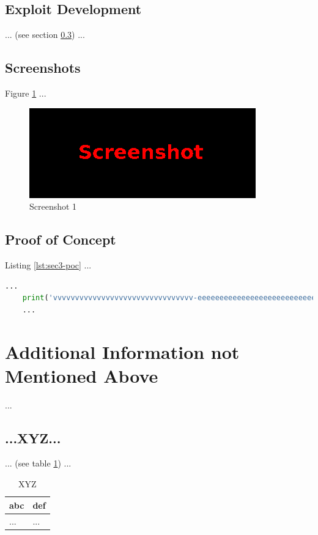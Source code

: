 \subsection{Exploit Development}\label{sec:sec3-expl}
%
... (see section \ref{sec:sec3-poc}) ...
%
%
%
\subsection{Screenshots}\label{sec:sec3-screen1}
%
Figure \ref{fig:sec3-screen1} ...

\begin{figure}[H]
    \centering
    \includegraphics[width=\textwidth]{img/assignment1/screen1.png}
    \caption{Screenshot 1}\label{fig:sec3-screen1}
\end{figure}
%
%
%
\subsection{Proof of Concept}\label{sec:sec3-poc}
Listing \ref{lst:sec3-poc} ...\\

\begin{lstlisting}[language=Python,caption={Proof of Concept}, label={lst:sec3-poc}]
    ...
    print('vvvvvvvvvvvvvvvvvvvvvvvvvvvvvvvv-eeeeeeeeeeeeeeeeeeeeeeeeeeeeeeeeeeeeeeeeeee-looooooooooooooooooooooong-striiiiiiiiiiiiiing')
    ...
\end{lstlisting}
%
%
%
\section{Additional Information not Mentioned Above}\label{sec:last}
%
...
%
%
%
\subsection{...XYZ...}\label{sec:last-xyz}
%
... (see table \ref{tbl:last-xyz}) ...

\begin{table}[H]
    \begin{tabularx}{\textwidth}{l|l}
        \textbf{abc} & \textbf{def} \\
        \hline
        ... & ...\\
    \end{tabularx}
    \caption{XYZ\label{tbl:last-xyz}}
\end{table}
%
%
%
